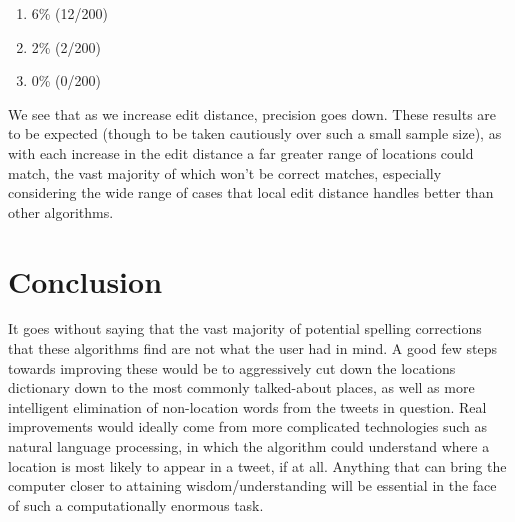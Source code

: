 \documentclass[twocolumn]{article}
\begin{document}
\begin{enumerate}
\item 6\% (12/200)
\item 2\% (2/200)
\item 0\% (0/200)
\end{enumerate}

We see that as we increase edit distance, precision goes down. These results are to be expected (though to be taken cautiously over such a small sample size), as with each increase in the edit distance a far greater range of locations could match, the vast majority of which won't be correct matches, especially considering the wide range of cases that local edit distance handles better than other algorithms.

\section{Conclusion}
It goes without saying that the vast majority of potential spelling corrections that these algorithms find are not what the user had in mind. A good few steps towards improving these would be to aggressively cut down the locations dictionary down to the most commonly talked-about places, as well as more intelligent elimination of non-location words from the tweets in question. Real improvements would ideally come from more complicated technologies such as natural language processing, in which the algorithm could understand where a location is most likely to appear in a tweet, if at all. Anything that can bring the computer closer to attaining wisdom/understanding will be essential in the face of such a computationally enormous task.


\printbibliography
\end{document}
